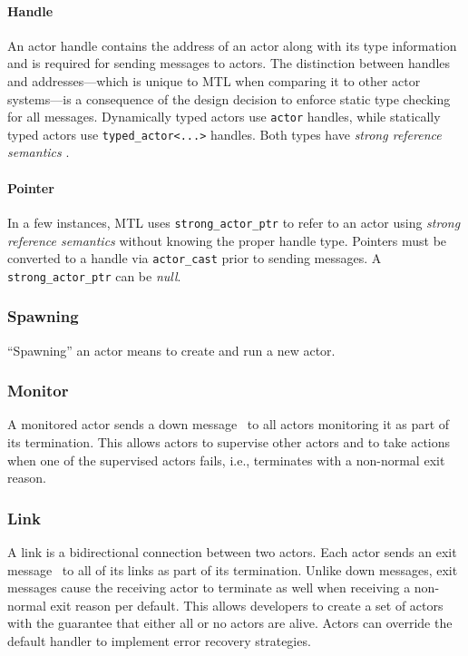 \paragraph{Handle}
\label{actor-handle}

An actor handle contains the address of an actor along with its type
information and is required for sending messages to actors. The distinction
between handles and addresses---which is unique to MTL when comparing it to
other actor systems---is a consequence of the design decision to enforce static
type checking for all messages. Dynamically typed actors use \lstinline^actor^
handles, while statically typed actors use \lstinline^typed_actor<...>^
handles. Both types have \emph{strong reference semantics}
.

\paragraph{Pointer}
\label{actor-pointer}

In a few instances, MTL uses \lstinline^strong_actor_ptr^ to refer to an actor
using \emph{strong reference semantics}  without
knowing the proper handle type. Pointers must be converted to a handle via
\lstinline^actor_cast^  prior to sending messages. A
\lstinline^strong_actor_ptr^ can be \emph{null}.

\subsubsection{Spawning}

``Spawning'' an actor means to create and run a new actor.

\subsubsection{Monitor}
\label{monitor}

A monitored actor sends a down message~ to all actors
monitoring it as part of its termination. This allows actors to supervise other
actors and to take actions when one of the supervised actors fails, i.e.,
terminates with a non-normal exit reason.

\subsubsection{Link}
\label{link}

A link is a bidirectional connection between two actors. Each actor sends an
exit message~ to all of its links as part of its termination.
Unlike down messages, exit messages cause the receiving actor to terminate as
well when receiving a non-normal exit reason per default. This allows
developers to create a set of actors with the guarantee that either all or no
actors are alive. Actors can override the default handler to implement error
recovery strategies.

